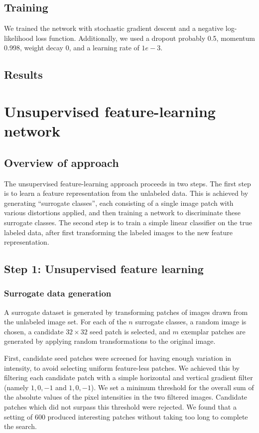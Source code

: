 \documentclass{article} %
\begin{document}
\subsection{Training}

We trained the network with stochastic gradient descent and a negative
log-likelihood loss function. Additionally, we used a dropout probably 0.5,
momentum 0.998, weight decay 0, and a learning rate of $1e-3$.

\subsection{Results}

\section{Unsupervised feature-learning network}
\subsection{Overview of approach}

The unsupervised feature-learning approach proceeds in two steps. The first step is to learn a feature representation from the unlabeled data. This is achieved by generating ``surrogate classes'', each consisting of a single image patch with various distortions applied, and then training a network to discriminate these surrogate classes. The second step is to train a simple linear classifier on the true labeled data, after first transforming the labeled images to the new feature representation.

\subsection{Step 1: Unsupervised feature learning}

\subsubsection{Surrogate data generation}

A surrogate dataset is generated by transforming patches of images drawn from the unlabeled image set. For each of the $n$ surrogate classes, a random image is chosen, a candidate $32\times32$ seed patch is selected, and $m$ exemplar patches are generated by applying random transformations to the original image.

First, candidate seed patches were screened for having enough variation in intensity, to avoid selecting uniform feature-less patches. We achieved this by filtering each candidate patch with a simple horizontal and vertical gradient filter (namely ${{1, 0, -1}}$ and ${{1},{0},{-1}}$). We set a minimum threshold for the overall sum of the absolute values of the pixel intensities in the two filtered images. Candidate patches which did not surpass this threshold were rejected. We found that a setting of $600$ produced interesting patches without taking too long to complete the search. 
\end{document}
